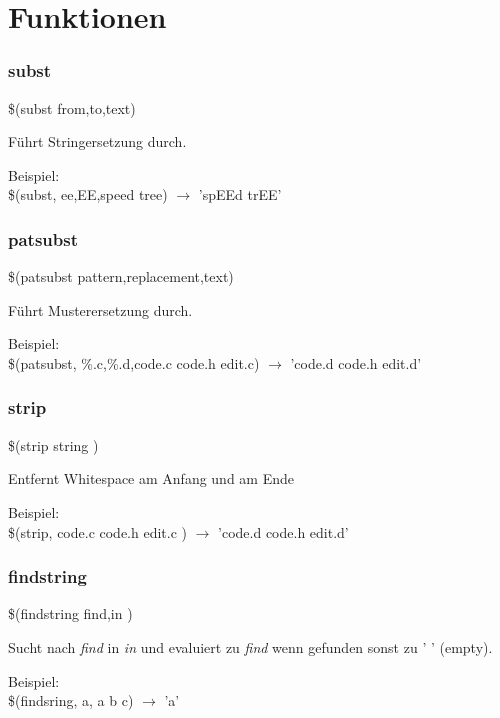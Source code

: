 \section{Funktionen}


\begin{frame}
	\frametitle{subst}
	\begin{Large}\$(subst from,to,text)\end{Large}

    \bigskip
    Führt Stringersetzung durch.
 
    \bigskip 
    Beispiel: \\
	\$(subst, ee,EE,speed tree) $\longrightarrow$ 'spEEd trEE'
\end{frame}

\begin{frame}
	\frametitle{patsubst}
	\begin{Large}\$(patsubst pattern,replacement,text)\end{Large}

	\bigskip
    Führt Musterersetzung durch.

    \bigskip 
    Beispiel: \\
	\$(patsubst, \%.c,\%.d,code.c code.h edit.c) $\longrightarrow$ 'code.d code.h edit.d'
\end{frame}

\begin{frame}
	\frametitle{strip}
	\begin{Large}\$(strip string )\end{Large}

    \bigskip
	Entfernt Whitespace am Anfang und am Ende

    \bigskip 
    Beispiel: \\
	\$(strip,   code.c code.h edit.c  ) $\longrightarrow$ 'code.d code.h edit.d'
\end{frame}

\begin{frame}
	\frametitle{findstring}
	\begin{Large}\$(findstring find,in )\end{Large}

    \bigskip
	Sucht nach \textit{find} in \textit{in} und evaluiert zu \textit{find} wenn gefunden sonst zu ' ' (empty).

    \bigskip 
    Beispiel: \\
	\$(findsring, a, a b c) $\longrightarrow$ 'a'
\end{frame}

